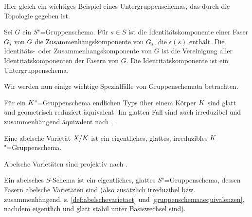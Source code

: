 Hier gleich ein wichtiges Beispiel eines Untergruppenschemas, das
durch die Topologie gegeben ist.
\begin{Definition}[Identitätskomponente]
  Sei $G$ ein $S$"=Gruppenschema.
  Für $s\in S$ ist die Identitätskomponente einer Faser $G_s$ von $G$
  die Zusammenhangskomponente von $G_s$, die $\epsilon(s)$ enthält.
  Die Identitäts-~oder Zusammenhangskomponente von $G$ ist
  die Vereinigung aller Identitätskomponenten der Fasern von $G$.
  Die Identitätskomponente ist ein Untergruppenschema.
\end{Definition}

Wir werden nun einige wichtige Spezialfälle von Gruppenschemata
betrachten.
\begin{Bemerkung}\label{gruppenschemaaequivalenzen}
  Für ein $K$"=Gruppenschema endlichen Typs über einem Körper $K$
  sind glatt und geometrisch reduziert äquivalent.
  Im glatten Fall sind auch irreduzibel und zusammenhängend äquivalent
  nach \cite[Exercise 3.16]{wedhorn}, \cite[Corollary 16.51]{wedhorn}.
\end{Bemerkung}
\begin{Definition}\label{def:abelschevarietaet}
  Eine abelsche Varietät $X/K$ ist ein eigentliches, glattes,
  irreduzibles $K$"=Gruppenschema.
\end{Definition}
\begin{Bemerkung}\label{thm:abvarietaetprojektiv}
  Abelsche Varietäten sind projektiv nach
  \cite[9.6, Proposition 4]{bosch}.
\end{Bemerkung}

\begin{Definition}
  Ein abelsches $S$-Schema ist ein eigentliches, glattes $S$"=Gruppenschema,
  dessen Fasern abelsche Varietäten sind 
  (also zusätzlich irreduzibel bzw. zusammenhängend,
  s. \ref{def:abelschevarietaet} und \ref{gruppenschemaaequivalenzen},
  nachdem eigentlich und glatt stabil unter Basiswechsel sind).
\end{Definition}

